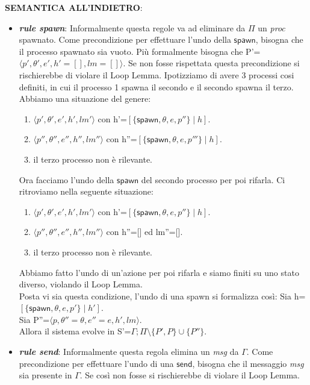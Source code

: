 \documentclass[background.tex]{subfiles}
\begin{document}
\textbf{SEMANTICA ALL'INDIETRO}:
	\begin{itemize}
		\item \textit{\textbf{rule spawn}}: Informalmente questa regole va ad eliminare da $\Pi$ un \textit{proc} spawnato. Come precondizione per effettuare l'undo della $\mathsf{spawn}$, bisogna che il processo spawnato sia vuoto. Più formalmente bisogna che P'=$\displaystyle \langle p',\theta',e',h'=[],lm=[]\rangle$. Se non fosse rispettata questa precondizione si rischierebbe di violare il Loop Lemma.
		Ipotizziamo di avere 3 processi cosi definiti, in cui il processo 1 spawna il secondo e il secondo spawna il terzo.
		Abbiamo una situazione del genere:
		\begin{enumerate}
			\item $\displaystyle \langle p',\theta',e',h',lm' \rangle$ con h'=$\displaystyle [\{\mathsf{spawn},\theta,e,p''\} \mid h]$.
			\item  $\displaystyle \langle p'',\theta'',e'',h'',lm''\rangle$ con h''=$\displaystyle[\{\mathsf{spawn},\theta,e,p'''\} \mid h]$.
			\item il terzo processo non è rilevante.
		\end{enumerate}
		Ora facciamo l'undo della $\mathsf{spawn}$ del secondo processo per poi rifarla.
		Ci ritroviamo nella seguente situazione:
			\begin{enumerate}
			\item $\displaystyle \langle p',\theta',e',h',lm' \rangle$ con h'=$\displaystyle [\{\mathsf{spawn},\theta,e,p''\} \mid h]$.
			\item $\displaystyle \langle p'',\theta'',e'',h'',lm'' \rangle$ con h''=[] ed lm''=[].
			\item il terzo processo non è rilevante.
		\end{enumerate}
		Abbiamo fatto l'undo di un'azione per poi rifarla e siamo finiti su uno stato diverso, violando il Loop Lemma.\\
		Posta vi sia questa condizione, l'undo di una spawn si formalizza così:
		Sia h=$\displaystyle [\{\mathsf{spawn},\theta,e,p'\} \mid h']$.\\
		Sia P''=$\displaystyle \langle p,\theta'' = \theta,e''=e,h',lm \rangle$.\\
		Allora il sistema evolve in S'=$\displaystyle \Gamma;\Pi\setminus\{P',P\}\cup\{P''\}$.
		\item \textit{\textbf{rule send}}: Informalmente questa regola elimina un \textit{msg} da $\Gamma$. Come precondizione per effettuare l'undo di una $\mathsf{send}$, bisogna che il messaggio \textit{msg} sia presente in $\Gamma$. Se così non fosse si rischierebbe di violare il Loop Lemma.

\end{itemize}
\end{document}
